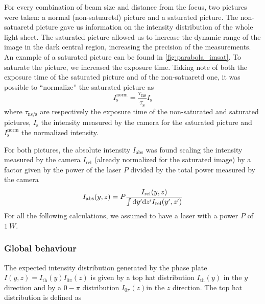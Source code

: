 For every combination of beam size and distance from the focus, two pictures were taken: a normal (non-satuaretd) picture and a saturated picture. The non-satuaretd picture gave us information on the intensity distribution of the whole light sheet. The saturated picture allowed us to increase the dynamic range of the image in the dark central region, increasing the precision of the measurements. An example of a saturated picture can be found in \cref{fig:parabola_imsat}. To saturate the picture, we increased the exposure time. Taking note of both the exposure time of the saturated picture and of the non-satuaretd one, it was possible to \enquote{normalize} the saturated picture as
\begin{equation}
    I_\text{s}^\text{norm} = \frac{\tau_\text{ns}}{\tau_\text{s}} I_\text{s}
\end{equation}
where $\tau_\text{ns/s}$ are respectively the exposure time of the non-saturated and saturated pictures, $I_\text{s}$ the intensity measured by the camera for the saturated picture and $I_\text{s}^\text{norm}$ the normalized intensity.

For both pictures, the absolute intensity $I_\text{abs}$ was found scaling the intensity measured by the camera $I_\text{rel}$ (already normalized for the saturated image) by a factor given by the power of the laser $P$ divided by the total power measured by the camera
\begin{equation}
    I_\text{abs}(y,z) = P\frac{I_\text{rel}(y,z)}{
        \int \differential y' \differential z' I_\text{rel}(y',z')}
\end{equation}
For all the following calculations, we assumed to have a laser with a power $P$ of $\SI{1}{W}$.

\subsubsection{Global behaviour}
The expected intensity distribution generated by the phase plate $I(y,z) = I_\text{th}(y) I_{0\pi}(z)$ is given by a top hat distribution $I_\text{th}(y)$ in the $y$ direction and by a $0-\pi$ distribution $I_{0\pi}(z)$in the $z$ direction. The top hat distribution is defined as


